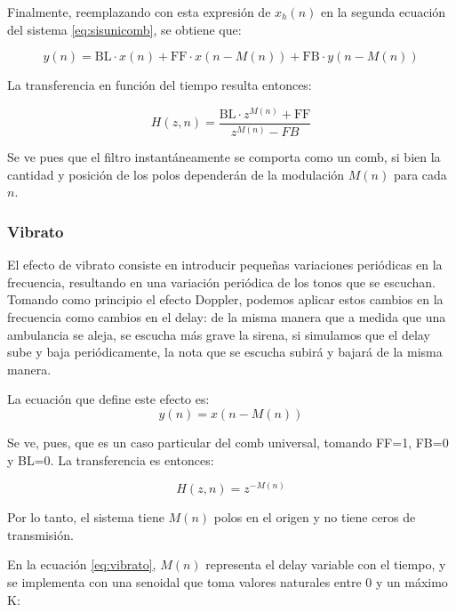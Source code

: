 \documentclass[assd_tp2_main.tex]{subfiles}
\begin{document}
Finalmente, reemplazando con esta expresi\'on de $x_h(n)$  en la segunda ecuaci\'on del sistema \ref{eq:sisunicomb}, se obtiene que:

\begin{equation}
	y(n) = \text{BL} \cdot x(n) + 
	\text{FF} \cdot x(n-M(n)) + \text{FB} \cdot y(n-M(n)) 
\end{equation}

La transferencia en funci\'on del tiempo resulta entonces:

\begin{equation}
	H(z, n) = \frac{\text{BL} \cdot z^{M(n)} +  \text{FF} }{z^{M(n)} - FB}
	\label{eq:tz-combuniv}
\end{equation}

Se ve pues que el filtro instant\'aneamente se comporta como un comb, si bien la cantidad y posici\'on de los polos depender\'an de la modulaci\'on $M(n)$ para cada $n$.


\subsubsection{Vibrato}

El efecto de vibrato consiste en introducir peque\~nas variaciones peri\'odicas en la frecuencia, resultando en una variaci\'on peri\'odica de los tonos que se escuchan. Tomando como principio el efecto Doppler, podemos aplicar estos cambios en la frecuencia como cambios en el delay: de la misma manera que a medida que una ambulancia se aleja, se escucha m\'as grave  la sirena, si simulamos que el delay sube y baja peri\'odicamente, la nota que se escucha subir\'a y bajar\'a de la misma manera.

La ecuaci\'on que define este efecto es:
\begin{equation}
	y(n) = x\left(n - M(n) \right)
	\label{eq:vibrato}
\end{equation}

Se ve, pues, que es un caso particular del comb universal, tomando FF=1, FB=0 y BL=0. La transferencia es entonces:

\begin{equation}
	H(z,n) = z^{-M(n)}
\end{equation}

Por lo tanto, el sistema tiene $M(n)$ polos en el origen y no tiene ceros de transmisi\'on.

En la ecuaci\'on \ref{eq:vibrato}, $M(n)$ representa el delay variable con el tiempo, y se implementa con una senoidal que toma valores naturales entre 0 y un m\'aximo K:
\end{document}
